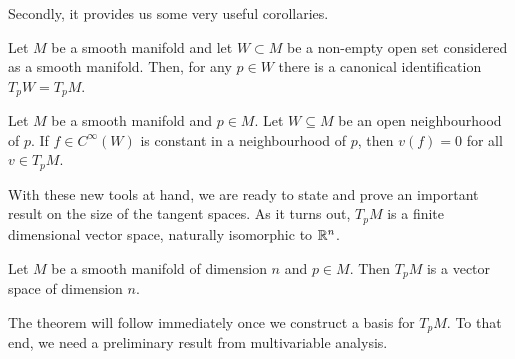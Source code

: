 Secondly, it provides us some very useful corollaries.

\begin{corollary}\label{cor:tgsubspace}
  Let $M$ be a smooth manifold and let $W\subset M$ be a non-empty open set considered as a smooth manifold.
  Then, for any $p\in W$ there is a canonical identification $T_pW = T_p M$.
\end{corollary}

\begin{corollary}\label{cor:derzero}
  Let $M$ be a smooth manifold and $p\in M$.
  Let $W\subseteq M$ be an open neighbourhood of $p$.
  If $f\in C^\infty(W)$ is constant in a neighbourhood of $p$, then $v(f) = 0$ for all $v\in T_p M$.
\end{corollary}

With these new tools at hand, we are ready to state and prove an important result on the size of the tangent spaces.
As it turns out, $T_pM$ is a finite dimensional vector space, naturally isomorphic to $\mathbb{R}^n$.

\begin{theorem}\label{thm:dimensionTpM}
  Let $M$ be a smooth manifold of dimension $n$ and $p\in M$.
  Then $T_pM$ is a vector space of dimension $n$.
\end{theorem}

The theorem will follow immediately once we construct a basis for $T_pM$.
To that end, we need a preliminary result from multivariable analysis.

